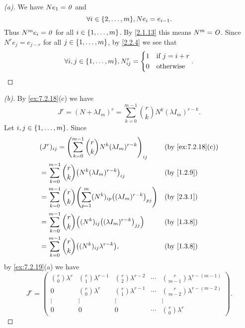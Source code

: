 \begin{proof}[(a)]
  We have \(N e_1 = \mathit{0}\) and
  \[
    \forall i \in \set{2, \dots, m}, N e_i = e_{i - 1}.
  \]
  Thus \(N^m e_i = \mathit{0}\) for all \(i \in \left\lbrace1, \dots, m\right\rbrace\).
  By \cref{2.1.13} this means \(N^m = \mathit{O}\).
  Since \(N^r e_j = e_{j - r}\) for all \(j \in \left\lbrace1, \dots, m\right\rbrace\), by \cref{2.2.4} we see that
  \[
    \forall i, j \in \set{1, \dots, m}, N_{i j}^r = \begin{dcases}
      1 & \text{if } j = i + r \\
      0 & \text{otherwise}
    \end{dcases}.
  \]
\end{proof}

\begin{proof}[(b)]
  By \cref{ex:7.2.18}(c) we have
  \[
    J^r = (N + \lambda I_m)^r = \sum_{k = 0}^{m - 1} \binom{r}{k} N^k (\lambda I_m)^{r - k}.
  \]
  Let \(i, j \in \left\lbrace1, \dots, m\right\rbrace\).
  Since
  \begin{align*}
     & (J^r)_{i j} = \pa{\sum_{k = 0}^{m - 1} \binom{r}{k} N^k (\lambda I_m)^{r - k}}_{i j}                 &  & \by{ex:7.2.18}[c] \\
     & = \sum_{k = 0}^{m - 1} \binom{r}{k} \pa{N^k (\lambda I_m)^{r - k}}_{i j}                             &  & \by{1.2.9}        \\
     & = \sum_{k = 0}^{m - 1} \binom{r}{k} \pa{\sum_{p = 1}^m (N^k)_{i p} \pa{(\lambda I_m)^{r - k}}_{p j}} &  & \by{2.3.1}        \\
     & = \sum_{k = 0}^{m - 1} \binom{r}{k} \pa{(N^k)_{i j} \pa{(\lambda I_m)^{r - k}}_{j j}}                &  & \by{1.3.8}        \\
     & = \sum_{k = 0}^{m - 1} \binom{r}{k} \pa{(N^k)_{i j} \lambda^{r - k}},                                &  & \by{1.3.8}
  \end{align*}
  by \cref{ex:7.2.19}(a) we have
  \[
    J^r = \begin{pmatrix}
      \binom{r}{0} \lambda^r & \binom{r}{1} \lambda^{r - 1} & \binom{r}{2} \lambda^{r - 2} & \cdots & \binom{r}{m - 1} \lambda^{r - (m - 1)} \\
      0                      & \binom{r}{0} \lambda^r       & \binom{r}{1} \lambda^{r - 1} & \cdots & \binom{r}{m - 2} \lambda^{r - (m - 2)} \\
      \vdots                 & \vdots                       & \vdots                       &        & \vdots                                 \\
      0                      & 0                            & 0                            & \cdots & \binom{r}{0} \lambda^r
    \end{pmatrix}.
  \]
\end{proof}

